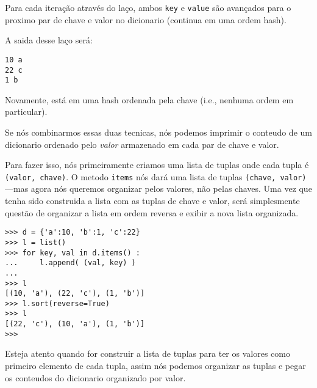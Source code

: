 Para cada iteração
através do laço, ambos {\tt key} e {\tt value} são avançados para o
proximo par de chave e valor no dicionario (continua em uma ordem hash).

A saida desse laço será:

\beforeverb
\begin{verbatim}
10 a
22 c
1 b
\end{verbatim}
\afterverb
%
Novamente, está em uma hash ordenada pela chave (i.e., nenhuma ordem em particular).

Se nós combinarmos essas duas tecnicas, nós podemos imprimir o conteudo
de um dicionario ordenado pelo \emph{valor} armazenado em cada par de 
chave e valor.

Para fazer isso, nós primeiramente criamos uma lista de tuplas onde cada tupla é
{\tt (valor, chave)}. O metodo {\tt items} nós dará uma lista de tuplas 
{\tt (chave, valor)} ---mas agora nós queremos organizar pelos valores, não pelas chaves.
Uma vez que tenha sido construida a lista com as tuplas de chave e valor, será
simplesmente questão de organizar a lista em ordem reversa e exibir a nova 
lista organizada.

\beforeverb
\begin{verbatim}
>>> d = {'a':10, 'b':1, 'c':22}
>>> l = list()
>>> for key, val in d.items() :
...     l.append( (val, key) )
... 
>>> l
[(10, 'a'), (22, 'c'), (1, 'b')]
>>> l.sort(reverse=True)
>>> l
[(22, 'c'), (10, 'a'), (1, 'b')]
>>> 
\end{verbatim}
\afterverb
%
Esteja atento quando for construir a lista de tuplas para ter os valores como
primeiro elemento de cada tupla, assim nós podemos organizar as tuplas e pegar os
conteudos do dicionario organizado por valor.

